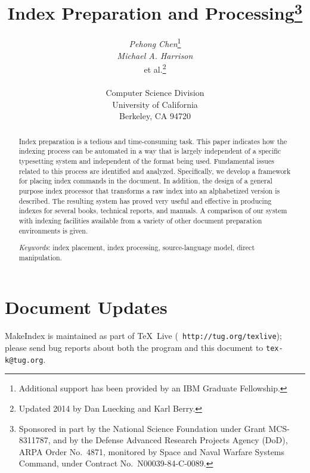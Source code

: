 


\title{Index Preparation and Processing\thanks{Sponsored
in part by the National Science Foundation under Grant MCS-8311787,
and by the Defense Advanced Research Projects Agency (DoD),
ARPA Order No.\ 4871, monitored by Space and Naval Warfare Systems Command,
under Contract No.\ N00039-84-C-0089.}
}

\author{{\sl Pehong Chen}\thanks{Additional support has been provided
by an IBM Graduate Fellowship.}\\
	{\sl Michael A. Harrison}\\
	{et al.}\thanks{Updated 2014 by Dan Luecking and Karl Berry.}\\
	\\
	Computer Science Division \\
	University of California \\
	Berkeley, CA 94720
}

\def\today{}
\maketitle

\begin{abstract}
Index preparation is a tedious and time-consuming task.
This paper indicates how the indexing process can be automated
in a way that is largely independent of a specific typesetting system
and independent of the format being used.
Fundamental issues related to this process are identified and analyzed.
Specifically, we develop a framework for placing index
commands in the document.  In addition, the design of
a general purpose index processor that
transforms a raw index into an alphabetized version is described.
The resulting system has proved very useful and effective in producing
indexes for several books, technical reports, and manuals.
A comparison of our system with indexing facilities
available from a variety of other document preparation environments is given.

{\it Keywords\/}: index placement, index processing, source-language model,
direct manipulation.
\end{abstract}

\section*{Document Updates}

MakeIndex is maintained as part of \TeX\ Live ({\tt
http://tug.org/texlive}); please send bug reports about both the program
and this document to {\tt tex-k@tug.org}.


